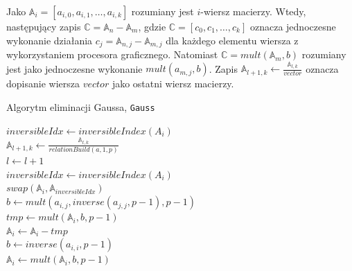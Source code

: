 \documentclass[]{article}
\begin{document}
		Jako \(\mathbb{A}_i = [a_{i,0}, a_{i,1}, \dots, a_{i,k}]\) rozumiany jest \(i\)-wiersz macierzy. Wtedy, następujący zapis \(\mathbb{C} = \mathbb{A}_n - \mathbb{A}_m\), gdzie \(\mathbb{C} = [c_0, c_1, \dots, c_k]\) oznacza jednoczesne wykonanie działania \(c_j = \mathbb{A}_{n,j} - \mathbb{A}_{m,j}\) dla każdego elementu wiersza z wykorzystaniem procesora graficznego. Natomiast \(\mathbb{C} = mult(\mathbb{A}_m, b)\) rozumiany jest jako jednoczesne wykonanie \(mult(a_{m,j}, b)\). Zapis \(\mathbb{A}_{l+1, k} \gets \frac{\mathbb{A}_{l, k}}{vector}\) oznacza dopisanie wiersza \(vector\) jako ostatni wiersz macierzy. 
		\newline
		\begin{algorithm}[H]
			\SetAlgoLined
			\label{Gauss}
			\caption{Algorytm eliminacji Gaussa, \texttt{Gauss}}
			
			{
				{
					{
						\(inversibleIdx \gets inversibleIndex(A_i)\) \\
						{
							\(\mathbb{A}_{l+1, k} \gets \frac{\mathbb{A}_{l, k}}{relationBuild(a, 1, p)} \)\\
							\(l \gets l + 1\) \\
							\(inversibleIdx \gets inversibleIndex(A_i)\) \\
							\(swap(\mathbb{A}_i, \mathbb{A}_{inversibleIdx})\) \\
						}
						\(b \gets mult(a_{i,j}, inverse(a_{j,j}, p-1), p-1)\) \\
						\(tmp \gets mult(\mathbb{A}_i, b, p-1)\) \\
						\(\mathbb{A}_i \gets \mathbb{A}_i - tmp\) \\
					}
				}
			}
			{
				\(b \gets inverse(a_{i,i}, p-1)\) \\
				\(\mathbb{A}_i \gets mult(\mathbb{A}_i, b, p-1)\) \\
			}
			
		\end{algorithm}
		
\end{document}
